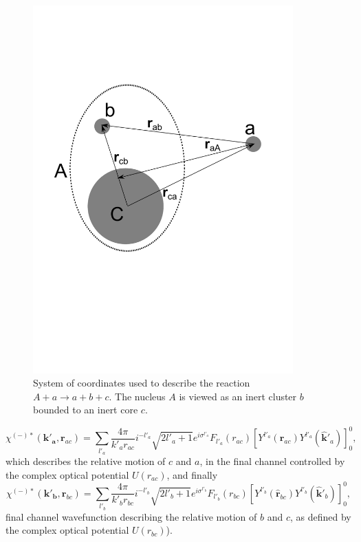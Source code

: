  \begin{figure}
\centerline{\includegraphics*[width=10cm,angle=0]{C6/figs_C6/knock1.pdf}}
\vspace{-4cm}
\caption{System of coordinates used to describe the reaction $A+a \rightarrow a+b+c$. The nucleus $A$ is viewed as an inert cluster $b$ bounded to an inert core $c$.}\label{figC6F1}
\end{figure}
 \begin{equation}\label{eqC6AppF7}
\chi^{(-)*}(\mathbf{k'_{a}},\mathbf{r}_{ac})= \sum_{l'_a}\frac{4\pi}{k'_a r_{ac}} i^{-l'_a}\sqrt{2l'_a+1}
e^{i\sigma^{l'_a}} F_{l'_a}(r_{ac}) \left[ Y^{l'_a} (\hat{\mathbf r}_{ac}) Y^{l'_a} (\hat{ \mathbf k}'_{a})\right]^0_0,
\end{equation}
which describes the  relative motion of $c$ and $a$, in the final channel controlled by the complex optical potential $U(r_{ac})$, and finally
 \begin{equation}\label{eqC6AppF8}
\chi^{(-)*}(\mathbf{k'_{b}},\mathbf{r}_{bc})= \sum_{l'_b}\frac{4\pi}{k'_b r_{bc}} i^{-l'_b}\sqrt{2l'_b+1}
e^{i\sigma^{l'_b}} F_{l'_b}(r_{bc}) \left[ Y^{l'_b} (\hat{\mathbf r}_{bc}) Y^{l'_b} (\hat{ \mathbf k}'_{b})\right]^0_0,
\end{equation}
final channel  wavefunction describing the relative motion of $b$ and $c$, as defined by the complex optical potential $U(r_{bc})$).
